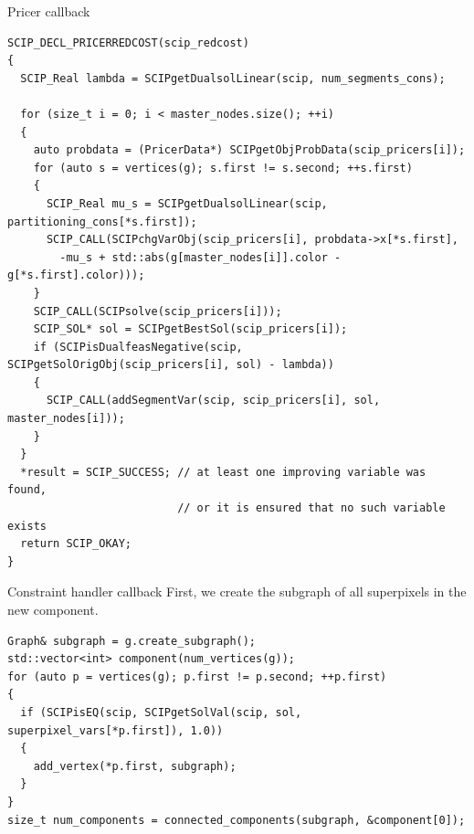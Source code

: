 \documentclass[fleqn]{beamer}
\begin{document}
    \begin{frame}[fragile]{Pricer callback}
        \begin{verbatim}
SCIP_DECL_PRICERREDCOST(scip_redcost)
{
  SCIP_Real lambda = SCIPgetDualsolLinear(scip, num_segments_cons);

  for (size_t i = 0; i < master_nodes.size(); ++i)
  {
    auto probdata = (PricerData*) SCIPgetObjProbData(scip_pricers[i]);
    for (auto s = vertices(g); s.first != s.second; ++s.first)
    {
      SCIP_Real mu_s = SCIPgetDualsolLinear(scip, partitioning_cons[*s.first]);
      SCIP_CALL(SCIPchgVarObj(scip_pricers[i], probdata->x[*s.first],
        -mu_s + std::abs(g[master_nodes[i]].color - g[*s.first].color)));
    }
    SCIP_CALL(SCIPsolve(scip_pricers[i]));
    SCIP_SOL* sol = SCIPgetBestSol(scip_pricers[i]);
    if (SCIPisDualfeasNegative(scip, SCIPgetSolOrigObj(scip_pricers[i], sol) - lambda))
    {
      SCIP_CALL(addSegmentVar(scip, scip_pricers[i], sol, master_nodes[i]));
    }
  }
  *result = SCIP_SUCCESS; // at least one improving variable was found,
                          // or it is ensured that no such variable exists
  return SCIP_OKAY;
}
        \end{verbatim}
    \end{frame}

    \begin{frame}[fragile]{Constraint handler callback}
        First, we create the subgraph of all superpixels in the new component. 
        \begin{verbatim}
Graph& subgraph = g.create_subgraph();
std::vector<int> component(num_vertices(g));
for (auto p = vertices(g); p.first != p.second; ++p.first)
{
  if (SCIPisEQ(scip, SCIPgetSolVal(scip, sol, superpixel_vars[*p.first]), 1.0))
  {
    add_vertex(*p.first, subgraph);
  }
}
size_t num_components = connected_components(subgraph, &component[0]);
         \end{verbatim}
        
    \end{frame}
\end{document}
